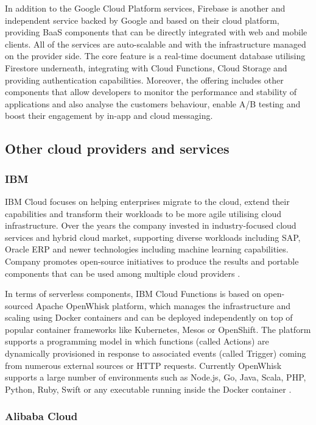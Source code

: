 In addition to the Google Cloud Platform services, Firebase \cite{Firebase} is another and independent service backed by Google and based on their cloud platform, providing BaaS components that can be directly integrated with web and mobile clients. All of the services are auto-scalable and with the infrastructure managed on the provider side. The core feature is a real-time document database utilising Firestore underneath, integrating with Cloud Functions, Cloud Storage and providing authentication capabilities. Moreover, the offering includes other components that allow developers to monitor the performance and stability of applications and also analyse the customers behaviour, enable A/B testing and boost their engagement by in-app and cloud messaging.

\subsection{Other cloud providers and services}

\subsubsection*{IBM}
IBM Cloud focuses on helping enterprises migrate to the cloud, extend their capabilities and transform their workloads to be more agile utilising cloud infrastructure. Over the years the company invested in industry-focused cloud services and hybrid cloud market, supporting diverse workloads including SAP, Oracle ERP and newer technologies including machine learning capabilities. Company promotes open-source initiatives to produce the results and portable components that can be used among multiple cloud providers \cite{Gartner}.

In terms of serverless components, IBM Cloud Functions is based on open-sourced Apache OpenWhisk platform, which manages the infrastructure and scaling using Docker containers and can be deployed independently on top of popular container frameworks like Kubernetes, Mesos or OpenShift. The platform supports a programming model in which functions (called Actions) are dynamically provisioned in response to associated events (called Trigger) coming from numerous external sources or HTTP requests. Currently OpenWhisk supports a large number of environments such as Node.js, Go, Java, Scala, PHP, Python, Ruby, Swift or any executable running inside the Docker container \cite{ApacheOpenWhisk}.

\subsubsection*{Alibaba Cloud}

